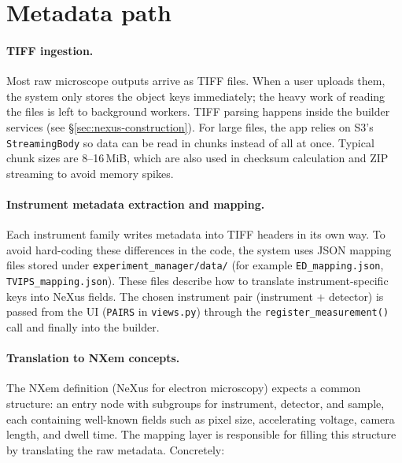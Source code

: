 
\section{Metadata path}\label{sec:metadata-path}

\paragraph{TIFF ingestion.}
Most raw microscope outputs arrive as TIFF files. When a user uploads them, the system only stores the object keys immediately; 
the heavy work of reading the files is left to background workers. 
TIFF parsing happens inside the builder services (see \S\ref{sec:nexus-construction}). 
For large files, the app relies on S3’s \texttt{StreamingBody} so data can be read in chunks instead of all at once. 
Typical chunk sizes are 8–16\,MiB, which are also used in checksum calculation and ZIP streaming to avoid memory spikes.

\paragraph{Instrument metadata extraction and mapping.}
Each instrument family writes metadata into TIFF headers in its own way. 
To avoid hard-coding these differences in the code, the system uses JSON mapping files stored under \texttt{experiment\_manager/data/} 
(for example \texttt{ED\_mapping.json}, \texttt{TVIPS\_mapping.json}). 
These files describe how to translate instrument-specific keys into NeXus fields. 
The chosen instrument pair (instrument + detector) is passed from the UI (\texttt{PAIRS} in \texttt{views.py}) 
through the \texttt{register\_measurement()} call and finally into the builder.

\paragraph{Translation to NXem concepts.}
The NXem definition (NeXus for electron microscopy) expects a common structure: 
an entry node with subgroups for instrument, detector, and sample, each containing well-known fields 
such as pixel size, accelerating voltage, camera length, and dwell time. 
The mapping layer is responsible for filling this structure by translating the raw metadata. Concretely:

